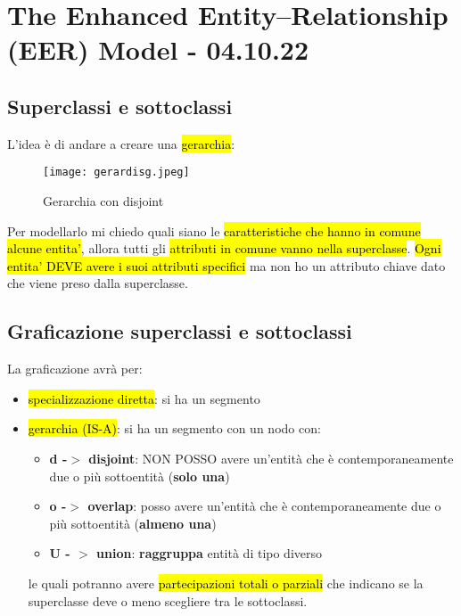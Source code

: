 \newpage
\section{The Enhanced Entity–Relationship (EER) Model - 04.10.22}


\subsection{Superclassi e sottoclassi}

L'idea è di andare a creare una \hl{gerarchia}:


\begin{figure}[H]
\centering
\texttt{[image: gerardisg.jpeg]}
\caption{Gerarchia con disjoint} 
\label{gerardisg}
\end{figure}


Per modellarlo mi chiedo quali siano le \hl{caratteristiche che hanno in comune alcune entita'}, allora tutti gli \hl{attributi in comune vanno nella superclasse}. \hl{Ogni entita' DEVE avere i suoi attributi specifici} ma non ho un attributo chiave dato che viene preso dalla superclasse.


\subsection{Graficazione superclassi e sottoclassi}

La graficazione avrà per:

\begin{itemize}
	\item \hl{specializzazione diretta}: si ha un segmento 
	\item \hl{gerarchia (IS-A)}: si ha un segmento con un nodo con:
		
		\begin{itemize}
			\item \textbf{d -$>$ disjoint}: NON POSSO avere un'entità che è contemporaneamente due o più sottoentità (\textbf{solo una})
			\item \textbf{o -$>$ overlap}: posso avere un'entità che è contemporaneamente due o più sottoentità (\textbf{almeno una})
			\item \textbf{U - $>$ union}: \textbf{raggruppa} entità di tipo diverso
		\end{itemize}
		
		le quali potranno avere \hl{partecipazioni totali o parziali} che indicano se la superclasse deve o meno scegliere tra le sottoclassi.
		
\end{itemize}


